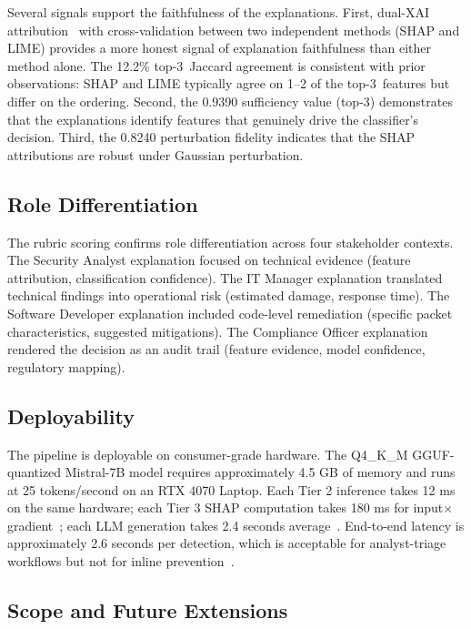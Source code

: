 \documentclass[sensors,apajournal,article,submit,moreauthors]{Definitions/mdpi}
\begin{document}
Several signals support the faithfulness of the explanations. First, dual-XAI attribution~\citep{lundberg2017unified,sundararajan2017axiomatic,bach2015pixel,ancona2018explaining,springenberg2014striving} with \mbox{cross-validation} between two independent methods (SHAP and LIME) provides a more honest signal of explanation faithfulness than either method alone. The 12.2\% \mbox{top-3 Jaccard} agreement is consistent with prior observations: SHAP and LIME typically agree on 1--2 of the \mbox{top-3 features} but differ on the ordering. Second, the 0.9390 sufficiency value (top-3) demonstrates that the explanations identify features that genuinely drive the classifier's decision. Third, the 0.8240 perturbation fidelity indicates that the SHAP attributions are robust under Gaussian perturbation.

\subsection{Role Differentiation}

The rubric scoring confirms role differentiation across four stakeholder contexts. The Security Analyst explanation focused on technical evidence (feature attribution, \mbox{classification} confidence). The IT Manager explanation translated technical findings into operational risk (estimated damage, response time). The Software Developer explanation included code-level remediation (specific packet characteristics, suggested mitigations). The Compliance Officer explanation rendered the decision as an audit trail (feature evidence, model confidence, regulatory mapping).

\subsection{Deployability}

The pipeline is deployable on \mbox{consumer-grade} hardware. The Q4\_K\_M GGUF-quantized Mistral-7B model requires approximately 4.5 GB of memory and runs at 25 tokens/second on an RTX 4070 Laptop. Each Tier 2 inference takes 12 ms on the same hardware; each Tier 3 SHAP computation takes 180 ms for input$\times$gradient~\citep{shrikumar2017learning}; each LLM generation takes 2.4 seconds average~\citep{jiang2023mistral}. End-to-end latency is approximately 2.6 seconds per detection, which is acceptable for analyst-triage workflows but not for inline prevention~\citep{khraisat2019survey}.

\subsection{Scope and Future Extensions}
\end{document}

